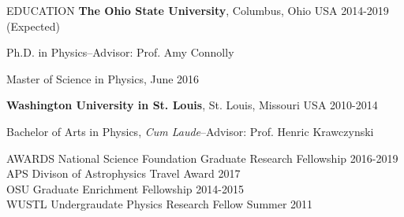 \documentclass{resume} %
\newenvironment{list1}{
  \begin{list}{\ding{113}}{%
      \setlength{\itemsep}{0in}
      \setlength{\parsep}{0in} \setlength{\parskip}{0in}
      \setlength{\topsep}{0in} \setlength{\partopsep}{0in} 
      \setlength{\leftmargin}{0.17in}}}{\end{list}}
\begin{document}

\begin{rSection}{EDUCATION}
\textbf{The Ohio State University}, Columbus, Ohio USA \hfill 2014-2019 (Expected)\\
\vspace*{-.15in}
\begin{list1}
\item[] Ph.D. in Physics--Advisor: Prof. Amy Connolly
\item [] Master of Science in Physics, June 2016
\end{list1}

\textbf{Washington University in St. Louis}, St. Louis, Missouri USA \hfill 2010-2014\\
\vspace*{-.15in}
\begin{list1}
\item[] Bachelor of Arts in Physics, {\em Cum Laude}--Advisor: Prof. Henric Krawczynski
\end{list1}
\end{rSection}


\begin{rSection}{AWARDS}
National Science Foundation Graduate Research Fellowship \hfill 2016-2019 \\
APS Divison of Astrophysics Travel Award \hfill 2017 \\
OSU Graduate Enrichment Fellowship \hfill 2014-2015 \\
WUSTL Undergraudate Physics Research Fellow \hfill Summer 2011 
\end{rSection}

\end{document}
